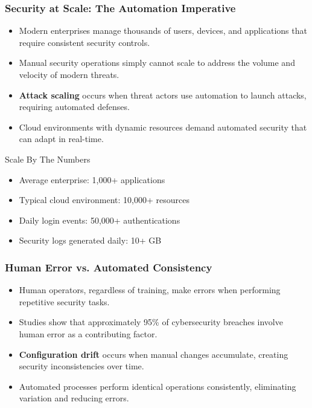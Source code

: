 \documentclass{beamer}
\begin{document}
\begin{frame}
  \frametitle{Security at Scale: The Automation Imperative}
  
  \begin{itemize}
    \item Modern enterprises manage thousands of users, devices, and applications that require consistent security controls.
    \item Manual security operations simply cannot scale to address the volume and velocity of modern threats.
    \item \textbf{Attack scaling} occurs when threat actors use automation to launch attacks, requiring automated defenses.
    \item Cloud environments with dynamic resources demand automated security that can adapt in real-time.
  \end{itemize}
  
  \begin{block}{Scale By The Numbers}
    \begin{itemize}
      \item Average enterprise: 1,000+ applications
      \item Typical cloud environment: 10,000+ resources
      \item Daily login events: 50,000+ authentications
      \item Security logs generated daily: 10+ GB
    \end{itemize}
  \end{block}
\end{frame}

\begin{frame}
  \frametitle{Human Error vs. Automated Consistency}
  
  \begin{itemize}
    \item Human operators, regardless of training, make errors when performing repetitive security tasks.
    \item Studies show that approximately 95\% of cybersecurity breaches involve human error as a contributing factor.
    \item \textbf{Configuration drift} occurs when manual changes accumulate, creating security inconsistencies over time.
    \item Automated processes perform identical operations consistently, eliminating variation and reducing errors.
  \end{itemize}
  
\end{frame}
\end{document}
